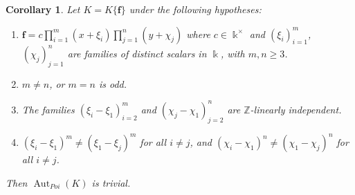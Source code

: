 \documentclass[12pt]{amsart}
\theoremstyle{plain}
\newtheorem{corollary}[theorem]{Corollary}
\numberwithin{theorem}{section}
\numberwithin{equation}{theorem}
\theoremstyle{definition}
\newcommand{\ZZ}{\mathbb{Z}}
\DeclareMathOperator{\Aut}{Aut}
\newcommand \bff {{\mathbf{f}}}
\newcommand \kx {\Bbbk^\times}
\begin{document}
\begin{corollary}  \label{zzcor7.7} 
Let $K = K\{\bff\}$ under the following hypotheses:
\begin{enumerate}
\item[(a)]
 $\bff = c\prod_{i=1}^m (x+\xi_i) \prod_{j=1}^{n} (y+\chi_j)$
where $c \in \kx$ and $(\xi_i)_{i=1}^{m}$, $(\chi_j)_{j=1}^n$ 
are families of distinct scalars in $\Bbbk$, with $m,n\ge3$.  
\item[(b)]
$m \ne n$, or $m=n$ is odd.
\item[(c)]
The families $(\xi_i-\xi_1)_{i=2}^m$ and $(\chi_j-\chi_1)_{j=2}^n$ are $\ZZ$-linearly independent.
\item[(d)]
$(\xi_i-\xi_1)^m \ne (\xi_1-\xi_j)^m$ for all $i\ne j$, and $(\chi_i-\chi_1)^n \ne (\chi_1-\chi_j)^n$ for all $i \ne j$.
\end{enumerate}

Then $\Aut_{Poi}(K)$ is trivial.
\end{corollary}
\end{document}
